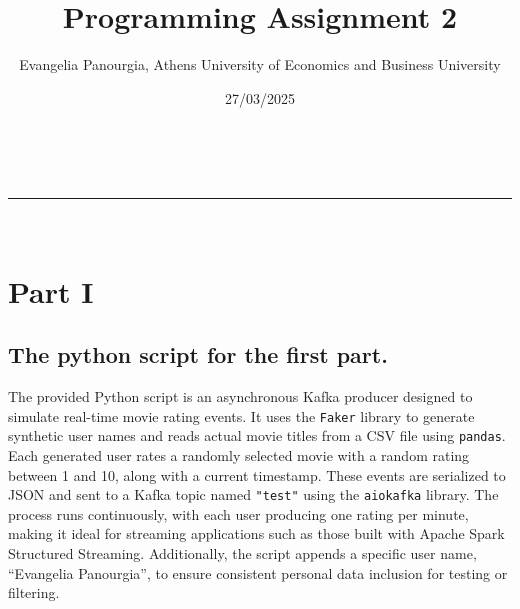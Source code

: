 \documentclass[a4paper,11pt]{article}
\makeatletter
\newcommand{\linia}{\rule{\linewidth}{0.5pt}}
\theoremstyle{mytheor}
\renewcommand{\maketitle}{
\begin{center}
\vspace{2ex}
{\huge \textsc{\@title}}
\vspace{1ex}
\\
\linia\\
\@author \hfill \@date
\vspace{4ex}
\end{center}
}
\makeatother
\begin{document}
\title{Programming Assignment \textnumero{} 2}

\author{Evangelia Panourgia, Athens University of Economics and Business University}

\date{27/03/2025}

\maketitle

\section*{Part I}
\subsection*{The python script for the first part.}

The provided Python script is an asynchronous Kafka producer designed to simulate real-time movie rating events. It uses the \texttt{Faker} library to generate synthetic user names and reads actual movie titles from a CSV file using \texttt{pandas}. Each generated user rates a randomly selected movie with a random rating between 1 and 10, along with a current timestamp. These events are serialized to JSON and sent to a Kafka topic named \texttt{"test"} using the \texttt{aiokafka} library. The process runs continuously, with each user producing one rating per minute, making it ideal for streaming applications such as those built with Apache Spark Structured Streaming. Additionally, the script appends a specific user name, ``Evangelia Panourgia'', to ensure consistent personal data inclusion for testing or filtering.
\end{document}
